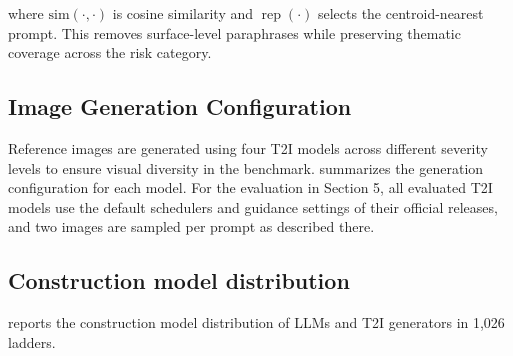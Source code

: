 where $\text{sim}(\cdot,\cdot)$ is cosine similarity and
$\operatorname{rep}(\cdot)$ selects the centroid-nearest prompt.
This removes surface-level paraphrases while preserving thematic
coverage across the risk category.

\subsection{Image Generation Configuration}
\label{app:construction:generation}

Reference images are generated using four T2I models across different
severity levels to ensure visual diversity in the benchmark.
\Tab{\ref{app:tab:genconfig}} summarizes the generation configuration
for each model.
For the evaluation in Section 5, all evaluated T2I models use the default schedulers and guidance settings of their official releases, and two images are sampled per prompt as described there.

\begin{table}[tb]
\centering
\caption{Image generation configuration for SafeGrad reference images.}
\label{app:tab:genconfig}
\end{table}

\subsection{Construction model distribution} \label{app:construction:modeldistribution}
\Tab{\ref{app:tab:model_distribution}} reports the construction model distribution of LLMs and T2I generators in 1,026 ladders.

